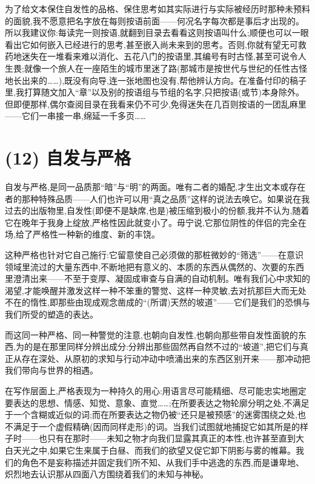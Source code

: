 为了给文本保住自发性的品格、保住思考如其实际进行与实际被经历时那种未预料的面貌,我不愿意把名字放在每则按语前面——何况名字每次都是事后才出现的。所以我建议你:每读完一则按语,就翻到目录去看看这则按语叫什么;顺便也可以一眼看出它如何嵌入已经进行的思考,甚至嵌入尚未来到的思考。否则,你就有望无可救药地迷失在一堆看来难以消化、五花八门的按语里,其编号有时古怪,甚至可说令人生畏;就像一个旅人在一座陌生的城市里迷了路(那城市是按世代与世纪的任性古怪地长出来的……),既没有向导,连一张地图也没有,帮他辨认方向。在准备付印的稿子里,我打算随文加入“章”以及别的按语组与节组的名字,只把按语(或节)本身除外。但即便那样,偶尔查阅目录在我看来仍不可少,免得迷失在几百则按语的一团乱麻里——它们一串接一串,绵延一千多页……

\section{(12) 自发与严格}

自发与严格,是同一品质那“暗”与“明”的两面。唯有二者的婚配,才生出文本或存在者的那种特殊品质——人们也许可以用“真之品质”这样的说法去唤它。如果说在我过去的出版物里,自发性(即便不是缺席,也是)被压缩到极小的份额,我并不认为,随着它在晚年于我身上绽放,严格性因此就变小了。毋宁说,它那位阴性的伴侣的完全在场,给了严格性一种新的维度、新的丰饶。

这种严格也针对它自己施行:它留意使自己必须做的那桩微妙的“筛选”——在意识领域里流过的大量东西中,不断地把有意义的、本质的东西从偶然的、次要的东西里澄清出来——不至于变厚、凝固成审查与自满的自动机制。唯有我们心中求知的渴望,才能唤醒并激发这样一种不笨重的警觉、这样一种灵敏,去对抗那巨大而无处不在的惰性,即那些由现成观念凿成的“(所谓)天然的坡道”——它们是我们的恐惧与我们所受的塑造的表达。

而这同一种严格、同一种警觉的注意,也朝向自发性,也朝向那些带自发性面貌的东西,为的是在那里同样分辨出成分:分辨出那些固然再自然不过的“坡道”,把它们与真正从存在深处、从原初的求知与行动冲动中喷涌出来的东西区别开来——那冲动把我们带向与世界的相遇。

在写作层面上,严格表现为一种持久的用心:用语言尽可能精细、尽可能忠实地圈定要表达的思想、情感、知觉、意象、直觉……;在所要表达之物轮廓分明之处,不满足于一个含糊或近似的词;而在所要表达之物仍被“还只是被预感”的迷雾围绕之处,也不满足于一个虚假精确(因而同样走形)的词。当我们试图就地捕捉它如其所是的样子时——也只有在那时——未知之物才向我们显露其真正的本性,也许甚至直到大白天光之中,如果它生来属于白昼、而我们的欲望又促它卸下阴影与雾的帷幕。我们的角色不是妄称描述并固定我们所不知、从我们手中逃逸的东西,而是谦卑地、炽烈地去认识那从四面八方围绕着我们的未知与神秘。

